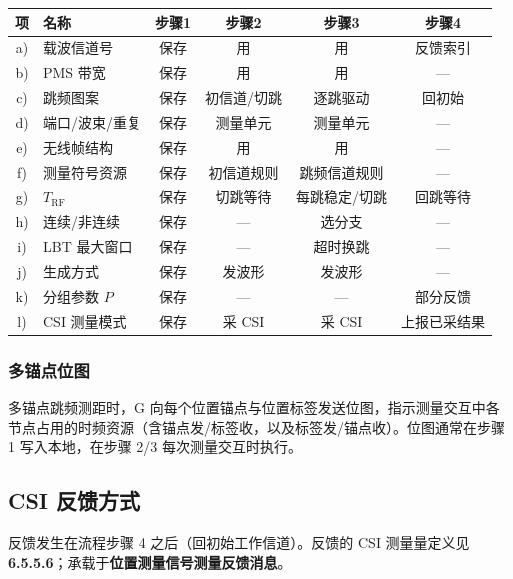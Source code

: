 \documentclass[11pt,a4paper]{ctexart}
\begin{document}
\begin{center}
\small
\begin{tabular}{|c|L{2.6cm}|c|c|c|c|}
\hline
\textbf{项} & \textbf{名称} & \textbf{步骤1} & \textbf{步骤2} & \textbf{步骤3} & \textbf{步骤4} \\
\hline
a) & 载波信道号 & 保存 & 用 & 用 & 反馈索引 \\
\hline
b) & PMS 带宽 & 保存 & 用 & 用 & --- \\
\hline
c) & 跳频图案 & 保存 & 初信道/切跳 & 逐跳驱动 & 回初始 \\
\hline
d) & 端口/波束/重复 & 保存 & 测量单元 & 测量单元 & --- \\
\hline
e) & 无线帧结构 & 保存 & 用 & 用 & --- \\
\hline
f) & 测量符号资源 & 保存 & 初信道规则 & 跳频信道规则 & --- \\
\hline
g) & $T_{\mathrm{RF}}$ & 保存 & 切跳等待 & 每跳稳定/切跳 & 回跳等待 \\
\hline
h) & 连续/非连续 & 保存 & --- & 选分支 & --- \\
\hline
i) & LBT 最大窗口 & 保存 & --- & 超时换跳 & --- \\
\hline
j) & 生成方式 & 保存 & 发波形 & 发波形 & --- \\
\hline
k) & 分组参数 $P$ & 保存 & --- & --- & 部分反馈 \\
\hline
l) & CSI 测量模式 & 保存 & 采 CSI & 采 CSI & 上报已采结果 \\
\hline
\end{tabular}
\end{center}

\subsubsection*{多锚点位图}

多锚点跳频测距时，G 向每个位置锚点与位置标签发送位图，指示测量交互中各节点占用的时频资源（含锚点发/标签收，以及标签发/锚点收）。位图通常在步骤 1 写入本地，在步骤 2/3 每次测量交互时执行。

\subsection{CSI 反馈方式}
\label{sec:feedback}

反馈发生在流程步骤 4 之后（回初始工作信道）。反馈的 CSI 测量量定义见 \textbf{6.5.5.6}；承载于\textbf{位置测量信号测量反馈消息}。
\end{document}
